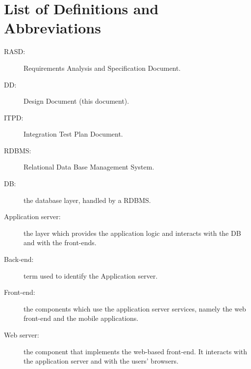 \section{List of Definitions and Abbreviations}
\label{sec:definitions}

\begin{description}
\item[RASD:] Requirements Analysis and Specification Document.
\item[DD:] Design Document (this document).
\item[ITPD:] Integration Test Plan Document.
\item[RDBMS:] Relational Data Base Management System.
\item[DB:] the database layer, handled by a RDBMS.
\item[Application server:] the layer which provides the application logic and interacts with the DB and with the front-ends.
\item[Back-end:] term used to identify the Application server.
\item[Front-end:] the components which use the application server services, namely the web front-end and the mobile applications.
\item[Web server:] the component that implements the web-based front-end. It interacts with the application server and with the users' browsers.
\end{description}
